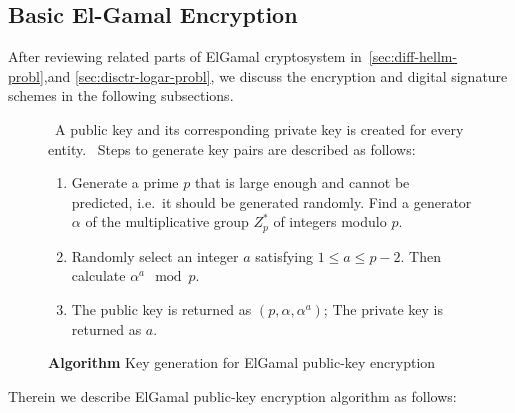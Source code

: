 \documentclass[12pt,journal,compsoc]{IEEEtran}
\begin{document}
\subsection{Basic El-Gamal Encryption}
After reviewing related parts of ElGamal cryptosystem
in~\autoref{sec:diff-hellm-probl},and
\autoref{sec:disctr-logar-probl}, we discuss the encryption and
digital signature schemes in the following subsections.
\par
\begin{figure}[!htbp]
  \centering
  \begin{algorithmic}
    \ENSURE~A public key and its corresponding private key is created
    for every entity.
    \STATE~Steps to generate key pairs are described as follows:
    \begin{enumerate}
    \item Generate a prime $p$ that is large enough and cannot be
      predicted, i.e.\ it should be generated randomly. Find a
      generator $\alpha$ of the multiplicative group $Z_{p}^{*}$ of
      integers modulo $p$.
    \item Randomly select an integer $a$ satisfying $1\leq
      a\leq p-2$. Then calculate $\alpha^{a}\mod p$.
    \item The public key is returned as $(p,\alpha,\alpha^{a})$; The
      private key is returned as $a$.
    \end{enumerate}
  \end{algorithmic}
  \caption{\textbf{Algorithm} Key generation for ElGamal public-key encryption}
  \label{fig:basic-elgamal-encryption}
\end{figure}
\par
Therein we describe ElGamal public-key encryption algorithm as
follows:
\end{document}
